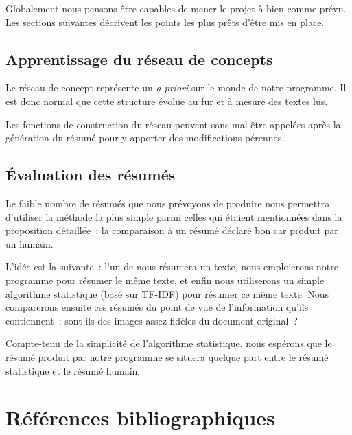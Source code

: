 \documentclass[a4paper, 12pt]{article}
\begin{document}
Globalement nous pensons être capables de mener le projet à bien comme prévu. Les sections suivantes décrivent les points les plus prêts d'être mis en place.

\subsection{Apprentissage du réseau de concepts}
Le réseau de concept représente un \textit{a priori} sur le monde de notre programme. Il est donc normal que cette structure évolue au fur et à mesure des textes lus. 

Les fonctions de construction du réseau peuvent sans mal être appelées après la génération du résumé pour y apporter des modifications pérennes.

\subsection{\'Evaluation des résumés}
Le faible nombre de résumés que nous prévoyons de produire nous permettra d'utiliser la méthode la plus simple parmi celles qui étaient mentionnées dans la proposition détaillée~: la comparaison à un résumé déclaré bon car produit par un humain.

L'idée est la suivante~: l'un de nous résumera un texte, nous emploierons notre programme pour résumer le même texte, et enfin nous utiliserons un simple algorithme statistique (basé sur TF-IDF) pour résumer ce même texte. Nous comparerons ensuite ces résumés du point de vue de l'information qu'ils contiennent~: sont-ils des images assez fidèles du document original~?

Compte-tenu de la simplicité de l'algorithme statistique, nous espérons que le résumé produit par notre programme se situera quelque part entre le résumé statistique et le résumé humain.

\section{Références bibliographiques}

\nocite{*}
\printbibliography{}

\appendix

\printindex
\end{document}
